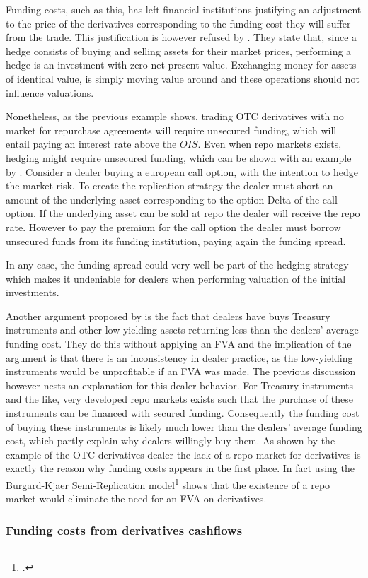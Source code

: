 \documentclass[../main.tex]{subfiles}
\begin{document}
        Funding costs, such as this, has left financial institutions justifying an adjustment to the price of the derivatives corresponding to the funding cost they will suffer from the trade. This justification is however refused by \cite{HullWhite2012FVA}. They state that, since a hedge consists of buying and selling assets for their market prices, performing a hedge is an investment with zero net present value. Exchanging money for assets of identical value, is simply moving value around and these operations should not influence valuations. 

        Nonetheless, as the previous example shows, trading OTC derivatives with no market for repurchase agreements will require unsecured funding, which will entail paying an interest rate above the $OIS$. Even when repo markets exists, hedging might require unsecured funding, which can be shown with an example by \cite{Castagna2012FVA}. Consider a dealer buying a european call option, with the intention to hedge the market risk. To create the replication strategy the dealer must short an amount of the underlying asset corresponding to the option Delta of the call option. If the underlying asset can be sold at repo the dealer will receive the repo rate. However to pay the premium for the call option the dealer must borrow unsecured funds from its funding institution, paying again the funding spread. 

        In any case, the funding spread could very well be part of the hedging strategy which makes it undeniable for dealers when performing valuation of the initial investments.

        Another argument proposed by \cite{HullWhite2012FVA} is the fact that dealers have buys Treasury instruments and other low-yielding assets returning less than the dealers' average funding cost. They do this without applying an FVA and the implication of the argument is that there is an inconsistency in dealer practice, as the low-yielding instruments would be unprofitable if an FVA was made. The previous discussion however nests an explanation for this dealer behavior. For Treasury instruments and the like, very developed repo markets exists such that the purchase of these instruments can be financed with secured funding. Consequently the funding cost of buying these instruments is likely much lower than the dealers' average funding cost, which partly explain why dealers willingly buy them. As shown by the example of the OTC derivatives dealer the lack of a repo market for derivatives is exactly the reason why funding costs appears in the first place. In fact \cite[Section~9.4.1]{Green2015XVA} using the Burgard-Kjaer Semi-Replication model\footcite{BurgardKjaer2013Funding} shows that the existence of a repo market would eliminate the need for an FVA on derivatives. 
        
    \subsubsection{Funding costs from derivatives cashflows}
\end{document}
